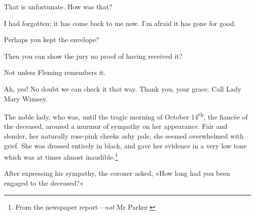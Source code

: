 \begin{dialogue}
 That is unfortunate. How was that?

 I had forgotten; it has come back to me now. I'm afraid it has gone for good.

 Perhaps you kept the envelope?

 

 Then you can show the jury no proof of having received it?

 Not unless Fleming remembers it.

 Ah, yes! No doubt we can check it that way. Thank you, your grace. Call Lady Mary Wimsey.
\end{dialogue}

The noble lady, who was, until the tragic morning of October 14\textsuperscript{th}, the fiancée of the deceased, aroused a murmur of sympathy on her appearance. Fair and slender, her naturally rose-pink cheeks ashy pale, she seemed overwhelmed with grief. She was dressed entirely in black, and gave her evidence in a very low tone which was at times almost inaudible.\footnote{From the newspaper report—\textit{not} Mr Parker.}

After expressing his sympathy, the coroner asked, »How long had you been engaged to the deceased?«

